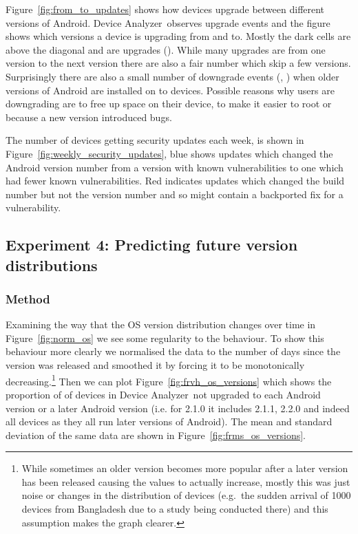 \documentclass[conference,a4paper,twoside]{IEEEtran}
\let\OldTodo\todo
\renewcommand{\todo}{\OldTodo[inline]}
\newcommand{\da}{Device Analyzer}
\begin{document}
Figure~\ref{fig:from_to_updates} shows how devices upgrade between different versions of Android.
\da\ observes upgrade events and the figure shows which versions a device is upgrading from and to.
Mostly the dark cells are above the diagonal and are upgrades (\daNumUpdatesUpgrades).
While many upgrades are from one version to the next version there are also a fair number which skip a few versions.
Surprisingly there are also a small number of downgrade events (\daNumUpdatesDowngrades, \daPercUpdatesDowngrades) when older versions of Android are installed on to devices.
Possible reasons why users are downgrading are to free up space on their device, to make it easier to root or because a new version introduced bugs.

The number of devices getting security updates each week, is shown in Figure~\ref{fig:weekly_security_updates}, blue shows updates which changed the Android version number from a version with known vulnerabilities to one which had fewer known vulnerabilities.
Red indicates updates which changed the build number but not the version number and so might contain a backported fix for a vulnerability.
\todo{ summary stats, what does this mean}






\subsection{Experiment 4: Predicting future version distributions}\label{sec:exp:predicting_distributions}
\subsubsection{Method}
Examining the way that the OS version distribution changes over time in Figure~\ref{fig:norm_os} we see some regularity to the behaviour.
To show this behaviour more clearly we normalised the data to the number of days since the version was released and smoothed it by forcing it to be monotonically decreasing.\footnote{While sometimes an older version becomes more popular after a later version has been released causing the values to actually increase, mostly this was just noise or changes in the distribution of devices (e.g.\ the sudden arrival of 1000 devices from Bangladesh due to a study being conducted there) and this assumption makes the graph clearer.}
Then we can plot Figure~\ref{fig:frvh_os_versions} which shows the proportion of of devices in \da\ not upgraded to each Android version or a later Android version (i.e. for 2.1.0 it includes 2.1.1, 2.2.0 and indeed all devices as they all run later versions of Android).
The mean and standard deviation of the same data are shown in Figure~\ref{fig:frms_os_versions}.
\end{document}
